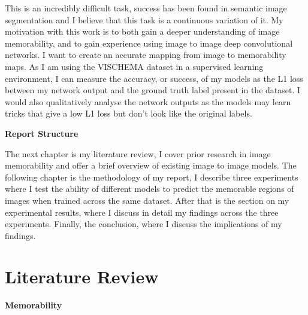 \documentclass{UoYCSproject}
\begin{document}


This is an incredibly difficult task, success has been found in semantic image segmentation \cite{wang2023internimage} and I believe that this task is a continuous variation of it. My motivation with this work is to both gain a deeper understanding of image memorability, and to gain experience using image to image deep convolutional networks. I want to create an accurate mapping from image to memorability maps. As I am using the VISCHEMA dataset in a supervised learning environment, I can measure the accuracy, or success, of my models as the L1 loss between my network output and the ground truth label present in the dataset. I would also qualitatively analyse the network outputs as the models may learn tricks that give a low L1 loss but don't look like the original labels.

\textbf{Report Structure}

The next chapter is my literature review, I cover prior research in image memorability and offer a brief overview of existing image to image models. The following chapter is the methodology of my report, I describe three experiments where I test the ability of different models to predict the memorable regions of images when trained across the same dataset. After that is the section on my experimental results, where I discuss in detail my findings across the three experiments. Finally, the conclusion, where I discuss the implications of my findings.

\chapter{Literature Review}


\textbf{Memorability}

\end{document}
